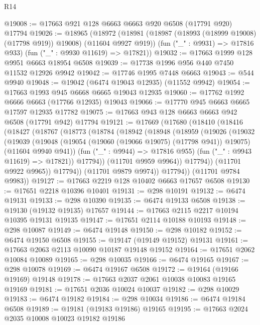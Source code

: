 \begin{lexlean}{R14}
\begin{coremodule}
{{{{{{{{{{{{{{{{{{{{{{{{{{{{{{{{{{{{{{{{{{{{{{{{{{{{{{{{{{{{{{{{{{{{{{{{{{{{{{{{{{@19008 := @17663 @921 @128 @6663 @6663 @920 @6508 (@17791 @920) @17794
@19026 := @18965
    (@18972
      (@18981 (@18987 (@18993 (@18999 @19008) (@17798 @919)) @19008) (@11604 @9927 @919))
      (fun ("_" : @9931) => @17816 @933)
      (fun ("_" : @9930 @11619) => @17821))
@19032 := @17663 @1999 @128 @9951 @6663 @18954 @6508
@19039 := @17738 @1996 @956 @440 @7450 @11532 @12926 @9942
@19042 := @17746 @1995 @7448 @6663
@19043 := @544 @9940
@19048 := @19042 (@6474 @19043 @12935) (@11552 @9942)
@19054 := @17663 @1993 @945 @6668 @6665 @19043 @12935
@19060 := @17762 @1992 @6666 @6663 (@17766 @12935) @19043
@19066 := @17770 @945 @6663 @6665 @17597 @12935 @17782
@19075 := @17663 @943 @128 @6663 @6663 @942 @6508 (@17791 @942) @17794
@19121 := @17669
    (@17680
      (@18410
        (@18416
          (@18427
            (@18767
              (@18773
                (@18784
                  (@18942
                    (@18948
                      (@18959
                        (@19026
                          (@19032
                            (@19039
                              (@19048
                                (@19054 (@19060 (@19066 @19075) (@17798 @941)) @19075)
                                (@11604 @9940 @941))
                              (fun ("_" : @9944) => @17816 @955)
                              (fun ("_" : @9943 @11619) => @17821))
                            @17794))
                        (@11701 @9959 @9964))
                      @17794))
                  (@11701 @9922 @9965))
                @17794))
            (@11701 @9879 @9974))
          @17794))
      (@11701 @9784 @9983))
@19127 := @17663 @2219 @128 @10402 @6663 @17657 @6508
@19130 := @17651 @2218 @10396 @10401
@19131 := @298 @10191
@19132 := @6474 @19131
@19133 := @298 @10390
@19135 := @6474 @19133 @6508
@19138 := @19130 (@19132 @19135) @17657
@19144 := @17663 @2115 @2217 @10194 @10395 @19131 @19135
@19147 := @17651 @2114 @10188 @10193
@19148 := @298 @10087
@19149 := @6474 @19148
@19150 := @298 @10182
@19152 := @6474 @19150 @6508
@19155 := @19147 (@19149 @19152) @19131
@19161 := @17663 @2063 @2113 @10090 @10187 @19148 @19152
@19164 := @17651 @2062 @10084 @10089
@19165 := @298 @10035
@19166 := @6474 @19165
@19167 := @298 @10078
@19169 := @6474 @19167 @6508
@19172 := @19164 (@19166 @19169) @19148
@19178 := @17663 @2037 @2061 @10038 @10083 @19165 @19169
@19181 := @17651 @2036 @10024 @10037
@19182 := @298 @10029
@19183 := @6474 @19182
@19184 := @298 @10034
@19186 := @6474 @19184 @6508
@19189 := @19181 (@19183 @19186) @19165
@19195 := @17663 @2024 @2035 @10008 @10023 @19182 @19186
}}}}}}}}}}}}}}}}}}}}}}}}}}}}}}}}}}}}}}}}}}}}}}}}}}}}}}}}}}}}}}}}}}}}}}}}}}}}}}}}}}
\end{coremodule}
\end{lexlean}
